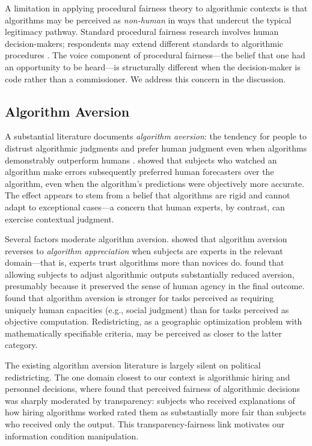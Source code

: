 A limitation in applying procedural fairness theory to algorithmic contexts is that algorithms may be perceived as \textit{non-human} in ways that undercut the typical legitimacy pathway. Standard procedural fairness research involves human decision-makers; respondents may extend different standards to algorithmic procedures \citep{svensson2022algorithmic}. The voice component of procedural fairness---the belief that one had an opportunity to be heard---is structurally different when the decision-maker is code rather than a commissioner. We address this concern in the discussion.

\subsection{Algorithm Aversion}

A substantial literature documents \textit{algorithm aversion}: the tendency for people to distrust algorithmic judgments and prefer human judgment even when algorithms demonstrably outperform humans \citep{dietvorst2015algorithm,dietvorst2018overcoming,logg2019algorithm}. \citet{dietvorst2015algorithm} showed that subjects who watched an algorithm make errors subsequently preferred human forecasters over the algorithm, even when the algorithm's predictions were objectively more accurate. The effect appears to stem from a belief that algorithms are rigid and cannot adapt to exceptional cases---a concern that human experts, by contrast, can exercise contextual judgment.

Several factors moderate algorithm aversion. \citet{logg2019algorithm} showed that algorithm aversion reverses to \textit{algorithm appreciation} when subjects are experts in the relevant domain---that is, experts trust algorithms more than novices do. \citet{dietvorst2018overcoming} found that allowing subjects to adjust algorithmic outputs substantially reduced aversion, presumably because it preserved the sense of human agency in the final outcome. \citet{castelo2019task} found that algorithm aversion is stronger for tasks perceived as requiring uniquely human capacities (e.g., social judgment) than for tasks perceived as objective computation. Redistricting, as a geographic optimization problem with mathematically specifiable criteria, may be perceived as closer to the latter category.

The existing algorithm aversion literature is largely silent on political redistricting. The one domain closest to our context is algorithmic hiring and personnel decisions, where \citet{lee2018understanding} found that perceived fairness of algorithmic decisions was sharply moderated by transparency: subjects who received explanations of how hiring algorithms worked rated them as substantially more fair than subjects who received only the output. This transparency-fairness link motivates our information condition manipulation.

